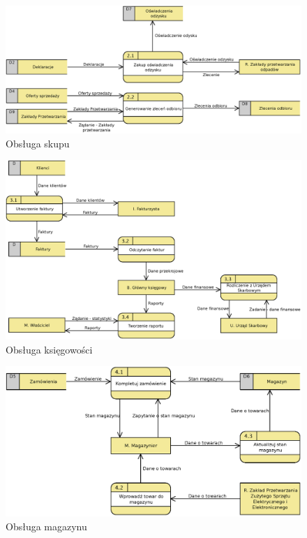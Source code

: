 	\begin{figure}[H]
		\centering
		\centerline{\includegraphics[width=1.1\textwidth]{img/DFD/2-level-skup.eps}}
		\caption{Obsługa skupu}
	\end{figure}
	
	\begin{figure}[H]
		\centering
		\centerline{\includegraphics[width=1.1\textwidth]{img/DFD/2-level-ksiegowosc.eps}}
		\caption{Obsługa księgowości}
	\end{figure}

	\begin{figure}[H]
		\centering
		\centerline{\includegraphics[width=1.1\textwidth]{img/DFD/2-level-magazyn.eps}}
		\caption{Obsługa magazynu}
	\end{figure}

